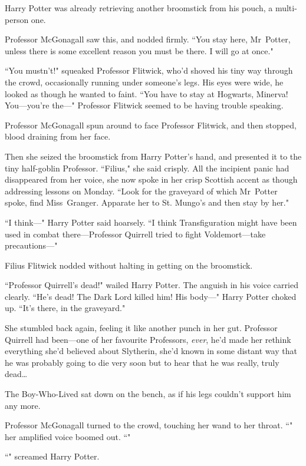 Harry Potter was already retrieving another broomstick from his pouch, a multi-person one.

Professor McGonagall saw this, and nodded firmly. ``You stay here, Mr~Potter, unless there is some excellent reason you must be there. I will go at once."

``You mustn't!" squeaked Professor Flitwick, who'd shoved his tiny way through the crowd, occasionally running under someone's legs. His eyes were wide, he looked as though he wanted to faint. ``You have to stay at Hogwarts, Minerva! You—you're the—" Professor Flitwick seemed to be having trouble speaking.

Professor McGonagall spun around to face Professor Flitwick, and then stopped, blood draining from her face.

Then she seized the broomstick from Harry Potter's hand, and presented it to the tiny half-goblin Professor. ``Filius," she said crisply. All the incipient panic had disappeared from her voice, she now spoke in her crisp Scottish accent as though addressing lessons on Monday. ``Look for the graveyard of which Mr~Potter spoke, find Miss~Granger. Apparate her to St. Mungo's and then stay by her."

``I think—" Harry Potter said hoarsely. ``I think Transfiguration might have been used in combat there—Professor Quirrell tried to fight Voldemort—take precautions—"

Filius Flitwick nodded without halting in getting on the broomstick.

``Professor Quirrell's dead!" wailed Harry Potter. The anguish in his voice carried clearly. ``He's dead! The Dark Lord killed him! His body—" Harry Potter choked up. ``It's there, in the graveyard."

She stumbled back again, feeling it like another punch in her gut. Professor Quirrell had been—one of her favourite Professors, \emph{ever}, he'd made her rethink everything she'd believed about Slytherin, she'd known in some distant way that he was probably going to die very soon but to hear that he was really, truly dead{\ldots}

The Boy-Who-Lived sat down on the bench, as if his legs couldn't support him any more.

Professor McGonagall turned to the crowd, touching her wand to her throat. ``" her amplified voice boomed out. ``"

``" screamed Harry Potter.

